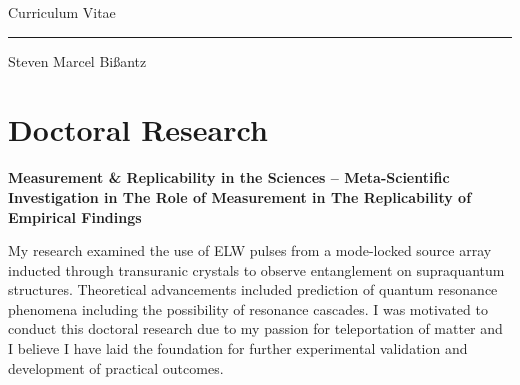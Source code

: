 \documentclass[10pt]{FreemanCV}
\begin{document}
\begin{paracol}{2} %


\parbox[][0.11\textheight][c]{\linewidth}{ 
	\centering %
	
	{\Huge\textcolor{headings}{Curriculum Vitae}} %
	\par\noindent\rule{6cm}{0.4pt}
	\medskip %
	
	{\sffamily\Large{Steven Marcel Bißantz}}
	
	\vfill %
}


\section{Doctoral Research}

{\raggedright\textbf{Measurement \& Replicability in the Sciences --
Meta-Scientific Investigation in The Role of Measurement in The Replicability
of Empirical Findings}\par}

\medskip %

My research examined the use of ELW pulses from a mode-locked source array
inducted through transuranic crystals to observe entanglement on supraquantum
structures. Theoretical advancements included prediction of quantum resonance
phenomena including the possibility of resonance cascades. I was motivated to
conduct this doctoral research due to my passion for teleportation of matter
and I believe I have laid the foundation for further experimental validation
and development of practical outcomes.

\medskip %



\end{paracol}
\end{document}
